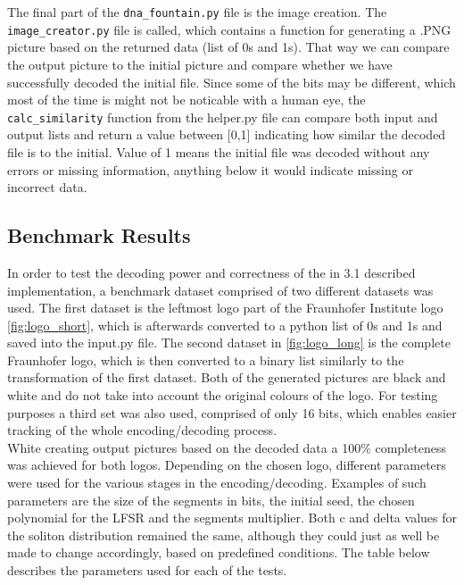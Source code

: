 \documentclass[12pt]%
{article}
\begin{document}
The final part of the \texttt{dna\_fountain.py} file is the image creation. The \texttt{image\_creator.py} file is called, which contains a function for generating a .PNG picture based on the returned data (list of 0s and 1s). That way we can compare the output picture to the initial picture and compare whether we have successfully decoded the initial file. Since some of the bits may be different, which most of the time is might not be noticable with a human eye, the \texttt{calc\_similarity} function from the helper.py file can compare both input and output lists and return a value between [0,1] indicating how similar the decoded file is to the initial. Value of 1 means the initial file was decoded without any errors or missing information, anything below it would indicate missing or incorrect data.


\subsection{Benchmark Results}

In order to test the decoding power and correctness of the in 3.1 described implementation, a benchmark dataset comprised of two different datasets was used. The first dataset is the leftmost logo part of the Fraunhofer Institute logo \ref{fig:logo_short}, which is afterwards converted to a python list of 0s and 1s and saved into the input.py file. The second dataset in \ref{fig:logo_long} is the complete Fraunhofer logo, which is then converted to a binary list similarly to the transformation of the first dataset. Both of the generated pictures are black and white and do not take into account the original colours of the logo. For testing purposes a third set was also used, comprised of only 16 bits, which enables easier tracking of the whole encoding/decoding process.  \\
White creating output pictures based on the decoded data a 100\% completeness was achieved for both logos. Depending on the chosen logo, different parameters were used for the various stages in the encoding/decoding. Examples of such parameters are the size of the segments in bits, the initial seed, the chosen polynomial for the LFSR and the segments multiplier. Both c and delta values for the soliton distribution remained the same, although they could just as well be made to change accordingly, based on predefined conditions. The table below describes the parameters used for each of the tests. \\
\end{document}

